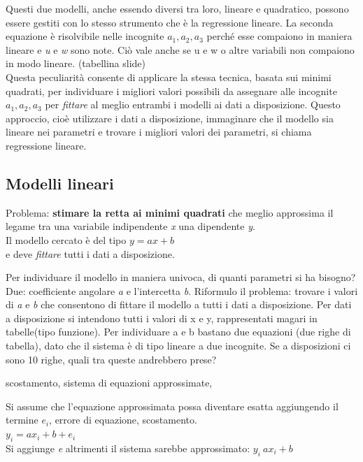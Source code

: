 \documentclass[10pt,a4paper]{article}
\begin{document}
Questi due modelli, anche essendo diversi tra loro, lineare e quadratico, possono essere gestiti con lo stesso strumento che è la regressione lineare.
La seconda equazione è risolvibile nelle incognite $  a_{1}, a_{2}, a_{3}$ perché esse compaiono in maniera lineare e \textit{u} e \textit{w} sono note. Ciò vale anche se u e w o altre variabili non compaiono in modo lineare. (tabellina slide)\\
Questa peculiarità consente di applicare la stessa tecnica, basata sui minimi quadrati, per individuare i migliori valori possibili da assegnare alle incognite $ a_{1}, a_{2}, a_{3} $ per \textit{fittare} al meglio entrambi i modelli ai dati a disposizione. Questo approccio, cioè utilizzare i dati a disposizione, immaginare che il modello sia lineare nei parametri e trovare i migliori valori dei parametri, si chiama regressione lineare.

\subsection{Modelli lineari}
Problema: \textbf{stimare la retta ai minimi quadrati} che meglio approssima il legame tra una variabile indipendente \textit{x} una dipendente \textit{y}.\\
Il modello cercato è del tipo $ y=ax+b $\\
e deve \textit{fittare} tutti i dati a disposizione.

Per individuare il modello in maniera univoca, di quanti parametri si ha bisogno?
Due: coefficiente angolare \textit{a} e l'intercetta \textit{b}. Riformulo il problema: trovare i valori di \textit{a} e \textit{b} che consentono di fittare il modello a tutti i dati a disposizione. Per dati a disposizione si intendono tutti i valori di x e y, rappresentati magari in tabelle(tipo funzione).
Per individuare a e b bastano due equazioni (due righe di tabella), dato che il sistema è di tipo lineare a due incognite. 
Se a disposizioni ci sono 10 righe, quali tra queste andrebbero prese?

scostamento, sistema di equazioni approssimate, 

Si assume che l'equazione approssimata possa diventare esatta aggiungendo il termine $e_{i}$, errore di equazione, scostamento.\\

$ y_{i}=ax_{i}+b+e_{i} $\\
Si aggiunge \textit{e} altrimenti il sistema sarebbe approssimato: $ y_{i}~ax_{i}+b $
\end{document}
